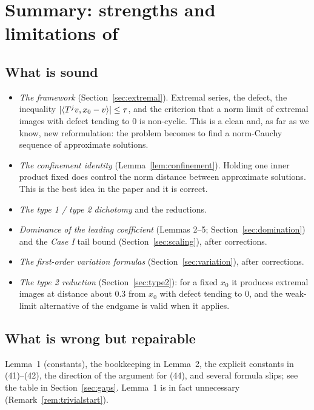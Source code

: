 \section{Summary: strengths and limitations of \paper{}}\label{sec:summary}

\subsection*{What is sound}
\begin{itemize}[leftmargin=2em]
\item \emph{The framework} (Section~\ref{sec:extremal}). Extremal series, the defect, the
inequality $\lvert \langle T^jv,x_0-v\rangle\rvert\le\tau$, and the criterion that a norm limit of extremal
images with defect tending to $0$ is non-cyclic. This is a clean and, as far as we know, new
reformulation: the problem becomes to find a norm-Cauchy sequence of approximate solutions.
\item \emph{The confinement identity} (Lemma~\ref{lem:confinement}). Holding one inner product
fixed does control the norm distance between approximate solutions. This is the best idea in
the paper and it is correct.
\item \emph{The type 1 / type 2 dichotomy} and the reductions.
\item \emph{Dominance of the leading coefficient} (Lemmas 2--5; Section~\ref{sec:domination})
and the \emph{Case I} tail bound (Section~\ref{sec:scaling}), after corrections.
\item \emph{The first-order variation formulas} (Section~\ref{sec:variation}), after
corrections.
\item \emph{The type 2 reduction} (Section~\ref{sec:type2}): for a fixed $x_0$ it produces
extremal images at distance about $0.3$ from $x_0$ with defect tending to $0$, and the
weak-limit alternative of the endgame is valid when it applies.
\end{itemize}

\subsection*{What is wrong but repairable}
Lemma~1 (constants), the bookkeeping in Lemma~2, the explicit constants in (41)--(42), the
direction of the argument for (44), and several formula slips; see the table in
Section~\ref{sec:gaps}. Lemma~1 is in fact unnecessary (Remark~\ref{rem:trivialstart}).

